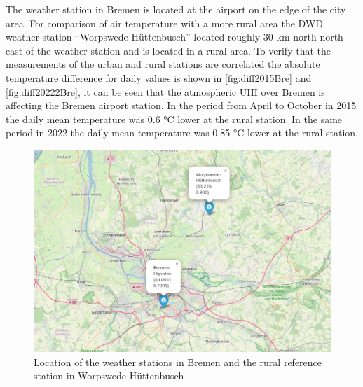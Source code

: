 \documentclass[12pt,a4paper, english,twoside]{article}
\begin{document}
      The weather station in Bremen is located at the airport on the edge of the city area. %
      For comparison of air temperature with a more rural area the \gls{DWD} weather station ``Worpswede-Hüttenbusch'' located roughly 30 km north-north-east of the weather station and is located in a rural area. 
      To verify that the measurements of the urban and rural stations are correlated the absolute temperature difference for daily values is shown in \cref{fig:diff2015Bre} and \cref{fig:diff20222Bre}, it can be seen that the atmospheric \gls{UHI} over Bremen is affecting the Bremen airport station. 
      In the period from April to October in 2015 the daily mean temperature was 0.6 °C lower at the rural station. 
      In the same period in 2022 the daily mean temperature was 0.85 °C lower at the rural station. 
      \begin{figure}[!htbp]
         \centering
            \includegraphics[width=\textwidth]{img/MapWetterstationenBremen.jpeg}
             \caption{Location of the weather stations in Bremen and the rural reference station in Worpswede-Hüttenbusch}\label{fig:mapWeatherstationsBremen}
      \end{figure}
\end{document}
